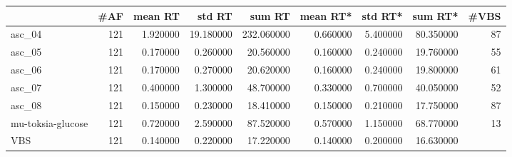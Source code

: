 \begin{tabular}{lrrrrrrrr}
\toprule
 & #AF & mean RT & std RT & sum RT & mean RT* & std RT* & sum RT* & #VBS \\
\midrule
asc_04 & 121 & 1.920000 & 19.180000 & 232.060000 & 0.660000 & 5.400000 & 80.350000 & 87 \\
asc_05 & 121 & 0.170000 & 0.260000 & 20.560000 & 0.160000 & 0.240000 & 19.760000 & 55 \\
asc_06 & 121 & 0.170000 & 0.270000 & 20.620000 & 0.160000 & 0.240000 & 19.800000 & 61 \\
asc_07 & 121 & 0.400000 & 1.300000 & 48.700000 & 0.330000 & 0.700000 & 40.050000 & 52 \\
asc_08 & 121 & 0.150000 & 0.230000 & 18.410000 & 0.150000 & 0.210000 & 17.750000 & 87 \\
mu-toksia-glucose & 121 & 0.720000 & 2.590000 & 87.520000 & 0.570000 & 1.150000 & 68.770000 & 13 \\
VBS & 121 & 0.140000 & 0.220000 & 17.220000 & 0.140000 & 0.200000 & 16.630000 &  \\
\bottomrule
\end{tabular}
